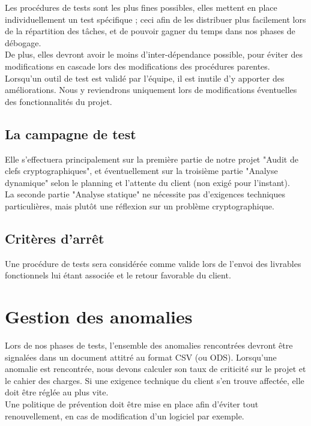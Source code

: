 \documentclass[a4paper,11pt,french]{article}
\begin{document}
Les procédures de tests sont les plus fines possibles, elles mettent en place individuellement un test spécifique ; ceci afin de les distribuer plus facilement lors de la répartition des tâches, et de pouvoir gagner du temps dans nos phases de débogage. \\

De plus, elles devront avoir le moins d'inter-dépendance possible, pour éviter des modifications en cascade lors des modifications des procédures parentes.
Lorsqu'un outil de test est validé par l'équipe, il est inutile d'y apporter des améliorations. Nous y reviendrons uniquement lors de modifications éventuelles des fonctionnalités du projet.

\subsection{La campagne de test}

Elle s'effectuera principalement sur la première partie de notre projet "Audit de clefs cryptographiques", et éventuellement sur la troisième partie "Analyse dynamique" selon le planning et l'attente du client (non exigé pour l'instant).\\

La seconde partie "Analyse statique" ne nécessite pas d'exigences techniques particulières, mais plutôt une réflexion sur un problème cryptographique.

\subsection{Critères d'arrêt}

Une procédure de tests sera considérée comme valide lors de l'envoi des livrables fonctionnels lui étant associée et le retour favorable du client.


\section{Gestion des anomalies}

Lors de nos phases de tests, l'ensemble des anomalies rencontrées devront être signalées dans un document attitré au format CSV (ou ODS). Lorsqu'une anomalie est rencontrée, nous devons calculer son taux de criticité sur le projet et le cahier des charges. Si une exigence technique du client s'en trouve affectée, elle doit être réglée au plus vite.\\

Une politique de prévention doit être mise en place afin d'éviter tout renouvellement, en cas de modification d'un logiciel par exemple.
\end{document}
